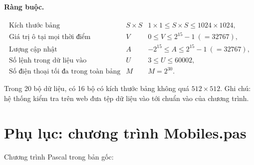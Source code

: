 \documentclass[11pt]{article}
\begin{document}
\paragraph{Ràng buộc.}
\[
\begin{array}{lll}
\text{Kích thước bảng} & S\times S &
  1\times 1\le S\times S\le 1024\times 1024,\\
\text{Giá trị ô tại mọi thời điểm} & V &
  0\le V\le 2^{15}-1\ (=32767),\\
\text{Lượng cập nhật} & A &
  -2^{15}\le A\le 2^{15}-1\ (=32767),\\
\text{Số lệnh trong dữ liệu vào} & U &
  3\le U\le 60002,\\
\text{Số điện thoại tối đa trong toàn bảng} & M &
  M=2^{30}.
\end{array}
\]

Trong 20 bộ dữ liệu, có 16 bộ có kích thước bảng không quá \(512\times 512\).
Ghi chú: hệ thống kiểm tra trên web đưa tệp dữ liệu vào tới chuẩn vào của
chương trình.

\section{Phụ lục: chương trình Mobiles.pas}

Chương trình Pascal trong bản gốc:
\end{document}
